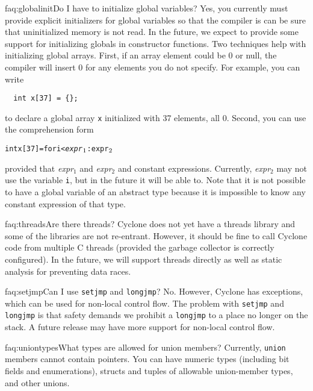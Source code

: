 \begin{faqa}{faq:globalinit}{Do I have to initialize global variables?}
Yes, you currently must provide explicit initializers for global
variables so that the compiler is can be sure that uninitialized
memory is not read.  In the future, we expect to provide some support
for initializing globals in constructor functions.  Two techniques
help with initializing global arrays.  First, if an array element
could be 0 or null, the compiler will insert 0 for any elements you do
not specify.  For example, you can write
\begin{verbatim}
  int x[37] = {};
\end{verbatim}
to declare a global array \texttt{x} initialized with 37 elements, all 0.
Second, you can use
the comprehension form
\begin{alltt}
  int x[37] = \lb for i < \textit{expr}\(\sb{1}\) : \texttt{expr}\(\sb{2}\) \rb
\end{alltt}
provided that 
\textit{expr}$_1$ and
\textit{expr}$_2$ and
constant expressions.
Currently, \textit{expr}$_2$ may not use the variable \texttt{i}, but
in the future it will be able to.  Note that it is not possible to
have a global variable of an abstract type because it is impossible to
know any constant expression of that type.
\end{faqa}

\begin{faqa}{faq:threads}{Are there threads?}
Cyclone does not yet have a threads library and some of the libraries
are not re-entrant.  However, it should be fine to call Cyclone code
from multiple C threads (provided the garbage collector is correctly
configured).  In the future, we will support threads directly as well
as static analysis for preventing data races.
\end{faqa}

\begin{faqa}{faq:setjmp}{Can I use \texttt{setjmp} and \texttt{longjmp}?}
No.  However, Cyclone has exceptions, which can be used for non-local
control flow.  The problem with \texttt{setjmp} and \texttt{longjmp}
is that safety demands we prohibit a \texttt{longjmp} to a place no
longer on the stack.  A future release may have more support for
non-local control flow.
\end{faqa}

\begin{faqa}{faq:uniontypes}{What types are allowed for union members?}
Currently, \texttt{union} members cannot contain pointers.  You can
have numeric types (including bit fields and enumerations), structs
and tuples of allowable union-member types, and other unions.
\end{faqa}

